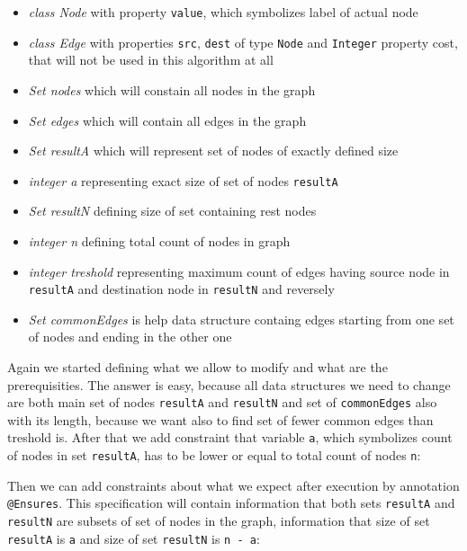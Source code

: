 \documentclass[11pt,twoside,a4paper]{book}
\begin{document}
\begin{itemize}
  \item \textit{class Node} with property \verb|value|, which symbolizes label
  of actual node
  \item \textit{class Edge} with properties \verb|src|, \verb|dest| of type
  \verb|Node| and \verb|Integer| property cost, that will not be used in this
  algorithm at all
  \item \textit{Set nodes} which will constain all nodes in the graph
  \item \textit{Set edges} which will contain all edges in the graph
  \item \textit{Set resultA} which will represent set of nodes of exactly
  defined size
  \item \textit{integer a} representing exact size of set of nodes
  \verb|resultA|
  \item \textit{Set resultN} defining size of set containing rest nodes
  \item \textit{integer n} defining total count of nodes in graph 
  \item \textit{integer treshold} representing maximum
  count of edges having source node in \verb|resultA| and destination node in \verb|resultN| and
  reversely
  \item \textit{Set commonEdges} is help data structure containg edges starting
  from one set of nodes and ending in the other one
\end{itemize}

Again we started defining what we allow to modify and what are the
prerequisities. The answer is easy, because all data structures we need to
change are both main set of nodes \verb|resultA| and \verb|resultN| and set of
\verb|commonEdges| also with its length, because we want also to find set of
fewer common edges than treshold is. After that we add constraint that
variable \verb|a|, which symbolizes count of nodes in set \verb|resultA|, has
to be lower or equal to total count of nodes \verb|n|:




Then we can add constraints about what we expect after execution by annotation
\verb|@Ensures|. This specification will contain information that both sets
\verb|resultA| and \verb|resultN| are subsets of set of nodes in the graph,
information that size of set \verb|resultA| is \verb|a| and size of set
\verb|resultN| is \verb|n - a|:
\end{document}
